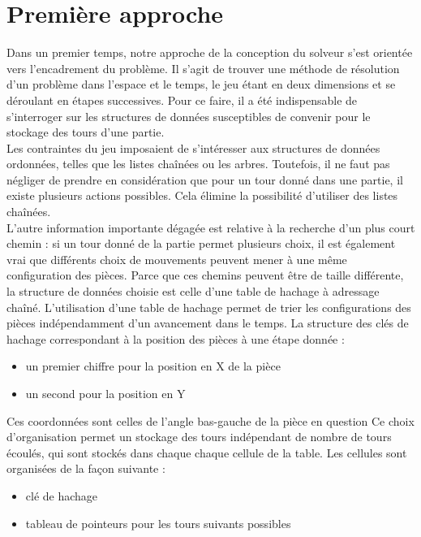 \documentclass{report}
\begin{document}
\section{Première approche}
Dans un premier temps, notre approche de la conception du solveur s'est orientée vers l'encadrement du problème.
Il s'agit de trouver une méthode de résolution d'un problème dans l'espace et le temps, le jeu étant en deux dimensions et se déroulant en étapes successives.
Pour ce faire, il a été indispensable de s'interroger sur les structures de données susceptibles de convenir pour le stockage des tours d'une partie.\\
Les contraintes du jeu imposaient de s'intéresser aux structures de données ordonnées, telles que les listes chaînées ou les arbres.
Toutefois, il ne faut pas négliger de prendre en considération que pour un tour donné dans une partie, il existe plusieurs actions possibles.
Cela élimine la possibilité d'utiliser des listes chaînées.\\
L'autre information importante dégagée est relative à la recherche d'un plus court chemin : si un tour donné de la partie permet plusieurs choix, il est également vrai que différents choix de mouvements peuvent mener à une même configuration des pièces.
Parce que ces chemins peuvent être de taille différente, la structure de données choisie est celle d'une table de hachage à adressage chaîné.
L'utilisation d'une table de hachage permet de trier les configurations des pièces indépendamment d'un avancement dans le temps.
La structure des clés de hachage correspondant à la position des pièces à une étape donnée :
\begin{itemize}
\item un premier chiffre pour la position en X de la pièce 
\item un second pour la position en Y 
\end{itemize}
Ces coordonnées sont celles de l'angle bas-gauche de la pièce en question
Ce choix d'organisation permet un stockage des tours indépendant de nombre de tours écoulés, qui sont stockés dans chaque chaque cellule de la table.
Les cellules sont organisées de la façon suivante :
\begin{itemize}
\item clé de hachage
\item tableau de pointeurs pour les tours suivants possibles
\end{itemize}
\end{document}
